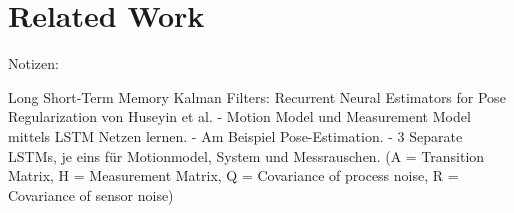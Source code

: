 \section{Related Work}

Notizen:

Long Short-Term Memory Kalman Filters: Recurrent Neural Estimators for Pose Regularization von Huseyin et al.
- Motion Model und Measurement Model mittels LSTM Netzen lernen. 
- Am Beispiel Pose-Estimation.
- 3 Separate LSTMs, je eins für Motionmodel, System und Messrauschen.
	(A = Transition Matrix, H = Measurement Matrix, Q = Covariance of process noise, R = Covariance of sensor noise)


